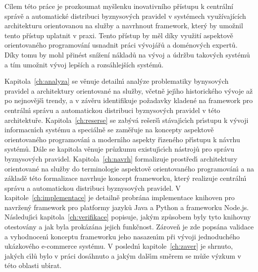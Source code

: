 Cílem této práce je prozkoumat myšlenku inovativního přístupu k centrální správě a automatické
distribuci byznysových pravidel v systémech využívajících architekturu orientovanou na služby
a navrhnout framework, který by umožnil tento přístup uplatnit v praxi.
Tento přístup by měl díky využití aspektově orientovaného programování usnadnit práci vývojářů
a doménových expertů. Díky tomu by mohl přinést snížení nákladů na vývoj a údržbu takových systémů
a tím umožnit vývoj lepších a rozsáhlejších systémů.

Kapitola~\ref{ch:analyza} se věnuje detailn\'{\i} anal\'yze problematiky bynysov\'ych pravidel a
architektury orientované na služby, včetně jej\'{\i}ho historického v\'yvoje až po nejnovějš\'{\i} trendy,
a v závěru identifikuje požadavky kladené na framework pro centráln\'{\i} správu a
automatickou distribuci byznysov\'ych pravidel v této architektuře. Kapitola~\ref{ch:reserse}
se zab\'yvá rešerš\'{\i} stávaj\'{\i}c\'{\i}ch pr\'{\i}stupu k v\'yvoji informacn\'{\i}ch systému a speciálně se zaměřuje
na koncepty aspektově orientovaného programován\'{\i} a modern\'{\i}ho aspekty ř\'{\i}zeného př\'{\i}stupu k návrhu
systémů. Dále se kapitola věnuje průzkumu existuj\'{\i}c\'{\i}ch nástrojů pro správu byznysov\'ych pravidel.
Kapitola~\ref{ch:navrh} formalizuje prostřed\'{\i} architektury orientované na služby do terminologie
aspektově orientovaného programován\'{\i} a na základě této formalizace navrhuje koncept frameworku,
kter\'y realizuje centráln\'{\i} správu a automatickou distribuci byznysov\'ych pravidel.
V kapitole~\ref{ch:implementace} je detailně probrána implementace knihoven pro navržen\'y framework
pro platformy jazyků Java a Python a frameworku Node.js. Následuj\'{\i}c\'{\i} kapitola~\ref{ch:verifikace}
popisuje, jak\'ym způsobem byly tyto knihovny otestovány a jak byla prokázána jejich funkčnost. Zároveň
je zde popsána validace a vyhodnocen\'{\i} konceptu frameworku jeho nasazen\'{\i}m při v\'yvoji
jednoduchého ukázkového e-commerce systému. V posledn\'{\i} kapitole~\ref{ch:zaver} je shrnuto, jak\'ych
c\'{\i}lů bylo v práci dosáhnuto a jak\'ym dalš\'{\i}m směrem se může v\'yzkum v této oblasti ub\'{\i}rat.

